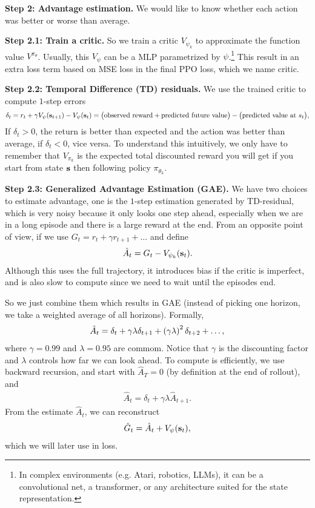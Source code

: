 \documentclass[11pt]{article}  %
\begin{document}
\textbf{Step 2: Advantage estimation.}
We would like to know whether each action was better or worse than average.

\textbf{Step 2.1: Train a critic.}
So we train a critic $V_{\psi_k}$ to approximate the function value $V^{\pi_\theta}$.
Usually, this $V_{\psi}$ can be a MLP parametrized by $\psi$.\footnote{In complex environments (e.g. Atari, robotics, LLMs), it can be a convolutional net, a transformer, or any architecture suited for the state representation.}
This result in an extra loss term based on MSE loss in the final PPO loss, which we name critic.

\textbf{Step 2.2: Temporal Difference (TD) residuals.}
We use the trained critic to compute $1$-step errors 
\begin{align*}
  \delta_t = r_t + \gamma V_{\psi}(\mathbf{s}_{t+1}) - V_\psi(\mathbf{s}_t) = \big(\text{observed reward} + \text{predicted future value}\big) - \big(\text{predicted value at } s_t\big),
\end{align*}
If $\delta_t > 0$, the return is better than expected and the action was better than average, if $\delta_t < 0$, vice versa.
To understand this intuitively, we only have to remember that $V_{\pi_k}$ is the expected total discounted reward you will get if you start from state $\mathbf{s}$ then following policy $\pi_{\theta_k}$.

\textbf{Step 2.3: Generalized Advantage Estimation (GAE).}
We have two choices to estimate advantage, one is the $1$-step estimation generated by TD-residual, which is very noisy because it only looks one step ahead, especially when we are in a long episode and there is a large reward at the end.
From an opposite point of view, if we use $G_t = r_t + \gamma r_{t+1} + \hdots$ and define 
\begin{align*}
  \hat{A}_t = G_t - V_{\psi_k}(\mathbf{s}_t).
\end{align*} 
Although this uses the full trajectory, it introduces bias if the critic is imperfect, and is also slow to compute since we need to wait until the episodes end.

So we just combine them which results in GAE (instead of picking one horizon, we take a weighted average of all horizons).
Formally, 
\begin{align*}
  \hat{A}_t = \delta_t + \gamma\lambda\delta_{t+1} + \left( \gamma\lambda \right)^2\delta_{t+2} + \hdots,
\end{align*}
where $\gamma = 0.99$ and $\lambda = 0.95$ are commom.
Notice that $\gamma$ is the discounting factor and $\lambda$ controls how far we can look ahead.
To compute is efficiently, we use backward recursion, and start with $\hat{A}_T = 0$ (by definition at the end of rollout), and 
\begin{align*}
  \hat{A}_t = \delta_t + \gamma\lambda\hat{A}_{t+1}.
\end{align*}
From the estimate $\hat{A}_t$, we can reconstruct 
\begin{align}
  \label{eq:GHAT}
  \hat{G}_t = \hat{A}_t + V_{\psi}(\mathbf{s}_t), 
\end{align}
which we will later use in loss.
\end{document}
